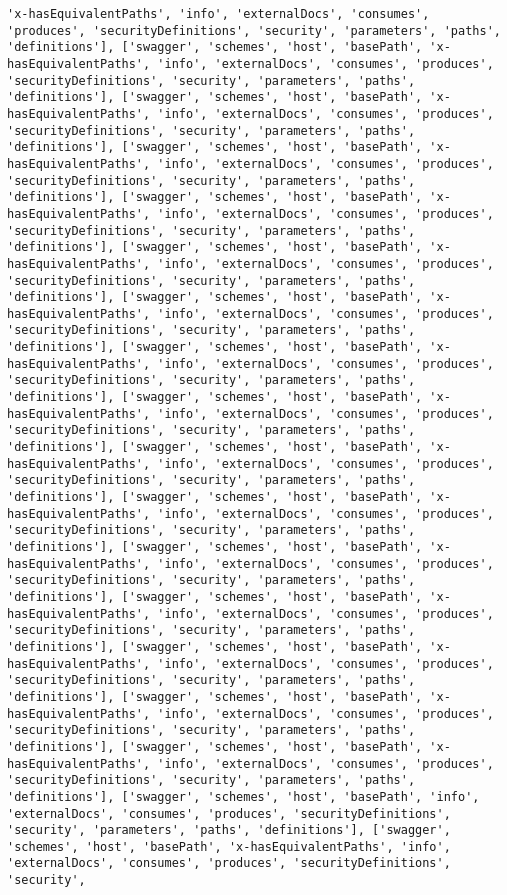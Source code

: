 \documentclass[11pt]{article}
\begin{document}
\begin{Verbatim}[commandchars=\\\{\}]
'x-hasEquivalentPaths', 'info', 'externalDocs', 'consumes', 'produces', 'securityDefinitions', 'security', 'parameters', 'paths', 'definitions'], ['swagger', 'schemes', 'host', 'basePath', 'x-hasEquivalentPaths', 'info', 'externalDocs', 'consumes', 'produces', 'securityDefinitions', 'security', 'parameters', 'paths', 'definitions'], ['swagger', 'schemes', 'host', 'basePath', 'x-hasEquivalentPaths', 'info', 'externalDocs', 'consumes', 'produces', 'securityDefinitions', 'security', 'parameters', 'paths', 'definitions'], ['swagger', 'schemes', 'host', 'basePath', 'x-hasEquivalentPaths', 'info', 'externalDocs', 'consumes', 'produces', 'securityDefinitions', 'security', 'parameters', 'paths', 'definitions'], ['swagger', 'schemes', 'host', 'basePath', 'x-hasEquivalentPaths', 'info', 'externalDocs', 'consumes', 'produces', 'securityDefinitions', 'security', 'parameters', 'paths', 'definitions'], ['swagger', 'schemes', 'host', 'basePath', 'x-hasEquivalentPaths', 'info', 'externalDocs', 'consumes', 'produces', 'securityDefinitions', 'security', 'parameters', 'paths', 'definitions'], ['swagger', 'schemes', 'host', 'basePath', 'x-hasEquivalentPaths', 'info', 'externalDocs', 'consumes', 'produces', 'securityDefinitions', 'security', 'parameters', 'paths', 'definitions'], ['swagger', 'schemes', 'host', 'basePath', 'x-hasEquivalentPaths', 'info', 'externalDocs', 'consumes', 'produces', 'securityDefinitions', 'security', 'parameters', 'paths', 'definitions'], ['swagger', 'schemes', 'host', 'basePath', 'x-hasEquivalentPaths', 'info', 'externalDocs', 'consumes', 'produces', 'securityDefinitions', 'security', 'parameters', 'paths', 'definitions'], ['swagger', 'schemes', 'host', 'basePath', 'x-hasEquivalentPaths', 'info', 'externalDocs', 'consumes', 'produces', 'securityDefinitions', 'security', 'parameters', 'paths', 'definitions'], ['swagger', 'schemes', 'host', 'basePath', 'x-hasEquivalentPaths', 'info', 'externalDocs', 'consumes', 'produces', 'securityDefinitions', 'security', 'parameters', 'paths', 'definitions'], ['swagger', 'schemes', 'host', 'basePath', 'x-hasEquivalentPaths', 'info', 'externalDocs', 'consumes', 'produces', 'securityDefinitions', 'security', 'parameters', 'paths', 'definitions'], ['swagger', 'schemes', 'host', 'basePath', 'x-hasEquivalentPaths', 'info', 'externalDocs', 'consumes', 'produces', 'securityDefinitions', 'security', 'parameters', 'paths', 'definitions'], ['swagger', 'schemes', 'host', 'basePath', 'x-hasEquivalentPaths', 'info', 'externalDocs', 'consumes', 'produces', 'securityDefinitions', 'security', 'parameters', 'paths', 'definitions'], ['swagger', 'schemes', 'host', 'basePath', 'x-hasEquivalentPaths', 'info', 'externalDocs', 'consumes', 'produces', 'securityDefinitions', 'security', 'parameters', 'paths', 'definitions'], ['swagger', 'schemes', 'host', 'basePath', 'x-hasEquivalentPaths', 'info', 'externalDocs', 'consumes', 'produces', 'securityDefinitions', 'security', 'parameters', 'paths', 'definitions'], ['swagger', 'schemes', 'host', 'basePath', 'info', 'externalDocs', 'consumes', 'produces', 'securityDefinitions', 'security', 'parameters', 'paths', 'definitions'], ['swagger', 'schemes', 'host', 'basePath', 'x-hasEquivalentPaths', 'info', 'externalDocs', 'consumes', 'produces', 'securityDefinitions', 'security', 
\end{Verbatim}
\end{document}
